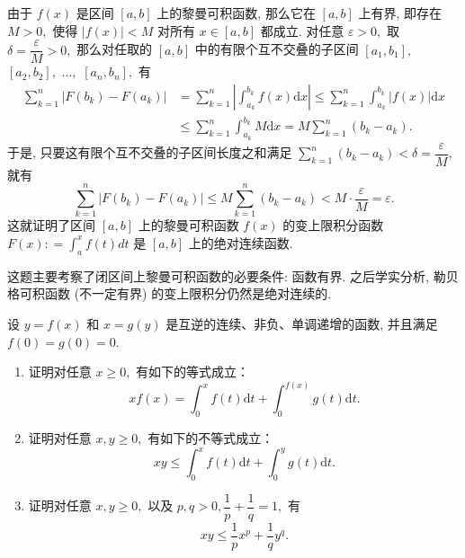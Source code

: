 \begin{solution}
由于 $f(x)$ 是区间 $[a, b]$ 上的黎曼可积函数, 那么它在 $[a, b]$ 上有界, 即存在 $M > 0,$ 使得 $\lvert f(x) \rvert < M$ 对所有 $x \in [a, b]$ 都成立. 对任意 $\varepsilon > 0,$ 取 $\delta = \dfrac{\varepsilon}{M} > 0,$ 那么对任取的 $[a, b]$ 中的有限个互不交叠的子区间 $[a_1, b_1],$ $[a_2, b_2],$ $\dots,$ $[a_n, b_n],$ 有
\begin{align*}
\sum\limits_{k=1}^n \lvert F(b_k) - F(a_k) \rvert & = \sum\limits_{k=1}^n \left\lvert \int_{a_k}^{b_k} f(x) \mathrm{d}x \right\rvert \leqslant \sum\limits_{k=1}^n \int_{a_k}^{b_k} \lvert f(x) \rvert \mathrm{d}x \\
& \leqslant \sum\limits_{k=1}^n \int_{a_k}^{b_k} M \mathrm{d}x = M \sum\limits_{k=1}^n (b_k - a_k).
\end{align*}
于是, 只要这有限个互不交叠的子区间长度之和满足 $\sum\limits_{k=1}^n (b_k - a_k) < \delta = \dfrac{\varepsilon}{M},$ 就有
$$\sum\limits_{k=1}^n \lvert F(b_k) - F(a_k) \rvert \leqslant M \sum\limits_{k=1}^n (b_k - a_k) < M \cdot \dfrac{\varepsilon}{M} = \varepsilon.$$
这就证明了区间 $[a, b]$ 上的黎曼可积函数 $f(x)$ 的变上限积分函数$F(x) : = \int_{a}^{x} f(t) dt$ 是 $[a, b]$ 上的绝对连续函数.

这题主要考察了闭区间上黎曼可积函数的必要条件: 函数有界. 之后学实分析, 勒贝格可积函数 (不一定有界) 的变上限积分仍然是绝对连续的.
\end{solution}

\begin{question}[points = 10]
设 $y = f(x)$ 和 $x = g(y)$ 是互逆的连续、非负、单调递增的函数, 并且满足 $f(0) = g(0) = 0.$
\begin{enumerate}
\item 证明对任意 $x \geqslant 0,$ 有如下的等式成立：
$$xf(x) = \int_0^x f(t) \mathrm{d}t + \int_0^{f(x)} g(t) \mathrm{d}t.$$
\item 证明对任意 $x, y \geqslant 0,$ 有如下的不等式成立：
$$xy \leqslant \int_0^x f(t) \mathrm{d}t + \int_0^y g(t) \mathrm{d}t.$$
\item 证明对任意 $x, y \geqslant 0,$ 以及 $p, q > 0, \dfrac{1}{p} + \dfrac{1}{q} = 1,$ 有
$$xy \leqslant \dfrac{1}{p} x^p + \dfrac{1}{q} y^q.$$
\end{enumerate}

\end{question}

